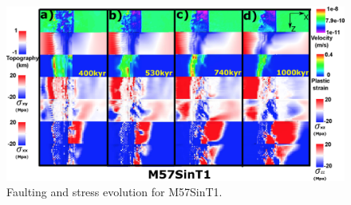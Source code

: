 \begin{figure}[h]
 \centering
  \includegraphics[width=1.0\textwidth]{./Figures/fig_Results_Weakening_3_M57SinT1_time_evolution.eps}
 \caption{Faulting and stress evolution for M57SinT1.}
\label{fig_Results_Weakenging_3}
\end{figure}


